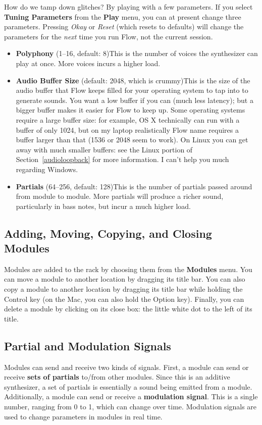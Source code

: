 \documentclass{article}
\newcommand\name{Flow}
\begin{document}
How do we tamp down glitches?  By playing with a few parameters. If you select {\bf Tuning Parameters} from the {\bf Play} menu, you can at present change three parameters.  Pressing {\it Okay} or {\it Reset} (which resets to defaults) will change the parameters for the {\it next} time you run {\name}, not the current session. 

\begin{itemize}
\item {\bf Polyphony} (1--16, default: 8)\qquad This is the number of voices the synthesizer can play at once.  More voices incurs a higher load.
\item {\bf Audio Buffer Size} (default: 2048, which is crummy)\qquad This is the size of the audio buffer that {\name} keeps filled for your operating system to tap into to generate sounds.  You want a low buffer if you can (much less latency); but a bigger buffer makes it easier for Flow to keep up.  Some operating systems require a large buffer size: for example, OS X technically can run with a buffer of only 1024, but on my laptop realistically {\name} name requires a buffer larger than that (1536 or 2048 seem to work). On Linux you can get away with much smaller buffers: see the Linux portion of Section~\ref{audioloopback} for more information.  I can't help you much regarding Windows.
\item {\bf Partials} (64--256, default: 128)\qquad This is the number of partials passed around from module to module.  More partials will produce a richer sound, particularly in bass notes, but incur a much higher load.
\end{itemize}


\subsection{Adding, Moving, Copying, and Closing Modules}  Modules are added to the rack by choosing them from the {\bf Modules} menu.  You can move a module to another location by dragging its title bar.  You can also copy a module to another location by dragging its title bar while holding the Control key (on the Mac, you can also hold the Option key).  Finally, you can delete a module by clicking on its close box: the little white dot to the left of its title.

\subsection{Partial and Modulation Signals}  Modules can send and receive two kinds of signals.  First, a module can send or receive {\bf sets of partials} to/from other modules.  Since this is an additive synthesizer, a set of partials is essentially a sound being emitted from a module.  Additionally, a module can send or receive a {\bf modulation signal}.  This is a single number, ranging from 0 to 1, which can change over time.  Modulation signals are used to change parameters in modules in real time.  
\end{document}
